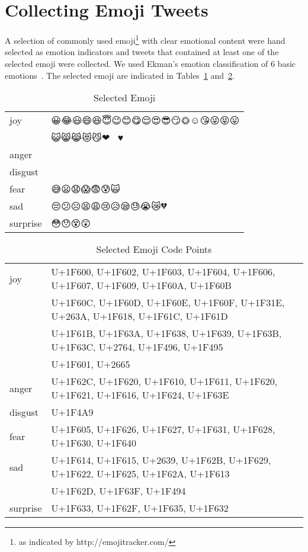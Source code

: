 \documentclass[10pt, a4paper]{article}
\begin{document}

\section{Collecting Emoji Tweets}
A selection of commonly used emoji\footnote{as indicated by http://emojitracker.com/} with clear emotional content were hand selected as emotion indicators and tweets that contained at least one of the selected emoji were collected. We used Ekman's emotion classification of 6 basic emotions~\cite{Ekman1992Argument}. The selected emoji are indicated in Tables~\ref{tab:selected-emoji} and~\ref{tab:selected-emoji-codpoints}.

\begin{table}
	\begin{tabular}{ll}
		joy & 😀😂😃😄😆😇😉😊😋😌😍😎😏🌞☺😘😜😝😛 \\
		& 😺😸😹😻😼❤💖💕😁♥ \\
		anger & 😬😠😐😑😠😡😖😤😾 \\
		disgust & 💩 \\
		fear & 😅😦😧😱😨😰🙀 \\
		sad & 😔😕☹😫😩😢😥😪😓😭😿💔 \\
		surprise & 😳😯😵😲 \\
	\end{tabular}
	\caption{Selected Emoji}
	\label{tab:selected-emoji}
\end{table}

\begin{table}
	\begin{tabular}{ll}
joy      & {\tiny U+1F600, U+1F602, U+1F603, U+1F604, U+1F606, U+1F607, U+1F609, U+1F60A, U+1F60B} \\
         & {\tiny U+1F60C, U+1F60D, U+1F60E, U+1F60F, U+1F31E, U+263A, U+1F618, U+1F61C, U+1F61D} \\
         & {\tiny U+1F61B, U+1F63A, U+1F638, U+1F639, U+1F63B, U+1F63C, U+2764, U+1F496, U+1F495} \\
         & {\tiny U+1F601, U+2665} \\
anger    & {\tiny U+1F62C, U+1F620, U+1F610, U+1F611, U+1F620, U+1F621, U+1F616, U+1F624, U+1F63E} \\
disgust  & {\tiny U+1F4A9} \\
fear     & {\tiny U+1F605, U+1F626, U+1F627, U+1F631, U+1F628, U+1F630, U+1F640} \\
sad      & {\tiny U+1F614, U+1F615, U+2639, U+1F62B, U+1F629, U+1F622, U+1F625, U+1F62A, U+1F613} \\
         & {\tiny U+1F62D, U+1F63F, U+1F494} \\
surprise & {\tiny U+1F633, U+1F62F, U+1F635, U+1F632} \\
	\end{tabular}
	\caption{Selected Emoji Code Points}
	\label{tab:selected-emoji-codpoints}
\end{table}
\end{document}
